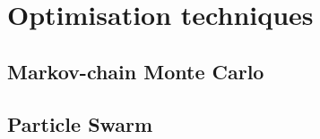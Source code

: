 \section{Optimisation techniques}
\label{sec:optimisation}

\subsection{Markov-chain Monte Carlo}

\subsection{Particle Swarm}
